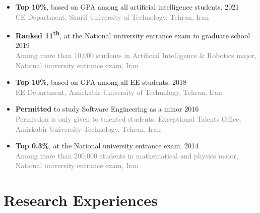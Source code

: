 \documentclass[11pt,a4paper,roman]{moderncv} %
\begin{document}
\begin{itemize}
	\item \textbf{Top 10\%}, based on GPA among all artificial intelligence students. \hfill 2021 \\
	\small{\textcolor{gray}{CE Department, Sharif University of Technology, Tehran, Iran}}
	
	\vspace{5pt}
	
	\item \textbf{Ranked 11\textsuperscript{th}}, at the National university entrance exam to graduate school \hfill 2019 \\
	\small{\textcolor{gray}{Among more than 10,000 students in Artificial Intelligence \& Robotics major, National university entrance exam, Iran}}
	
	\vspace{5pt}
	
	\item \textbf{Top 10\%}, based on GPA among all EE students. \hfill 2018 \\
	\small{\textcolor{gray}{EE Department, Amirkabir University of Technology, Tehran, Iran}}
	
	\vspace{5pt}
	
	\item \textbf{Permitted} to study Software Engineering as a minor \hfill 2016 \\
	\small{\textcolor{gray}{Permission is only given to talented students, Exceptional Talents Office, Amirkabir University Technology, Tehran, Iran}}
	
	\vspace{5pt}
	
	\item \textbf{Top 0.3\%}, at the National university entrance exam. \hfill 2014 \\
	\small{\textcolor{gray}{Among more than 200,000 students in mathematical and physics major, National university entrance exam, Iran}}
\end{itemize}

\section{Research Experiences}
\end{document}
